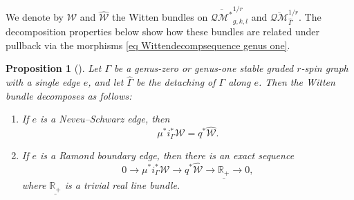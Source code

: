 \documentclass[11pt]{amsart}
\newtheorem{pr}[dummy]{Proposition}
\theoremstyle{definition}
\theoremstyle{remark}
\newcommand{\oQMb}{{\overline{\mathcal{QM}}}}
\newcommand{\<}{\left<}
\renewcommand{\>}{\right>}
\numberwithin{equation}{section}
\begin{document}
We denote by ${\mathcal{W}}$ and $\widehat{{\mathcal{W}}}$ the Witten bundles on $\overline{\mathcal{QM}^*}_{g,k,l}^{1/r}$ and %
$\oQMb_{\widehat{\Gamma}}^{1/r}$. The decomposition %
properties below show how these bundles are related under pullback via the morphisms \eqref{eq Wittendecompsequence genus one}.  

\begin{pr}[{\cite[Proposition 2.20]{TZ1}}]
\label{prop decomposition}
Let $\Gamma$ be a genus-zero or genus-one stable graded $r$-spin graph with a single edge $e$, and let $\widehat{\Gamma}$ be the detaching of $\Gamma$ along $e$.  Then the Witten bundle decomposes %
as follows:
\begin{enumerate}
\item\label{it NS} If %
$e$ is a Neveu--Schwarz edge, %
then \begin{equation}\label{eq NSdecompses}
\mu^*i_{\Gamma}^*{\mathcal{W}} = q^*\widehat{{\mathcal{W}}}.
\end{equation}

\item\label{it decompose Ramond boundary edge} If %
$e$ is a Ramond boundary edge, then there is an exact sequence
\begin{equation}
\label{eq decompose}0 \to \mu^*i_{\Gamma}^*{\mathcal{W}} \to q^*\widehat{{\mathcal{W}}} \to \underline{\mathbb{R}_+} \to 0,
\end{equation}
where $\underline{\mathbb{R}_+}$ is a trivial real line %
bundle.


\end{enumerate}
\end{pr}
\end{document}
